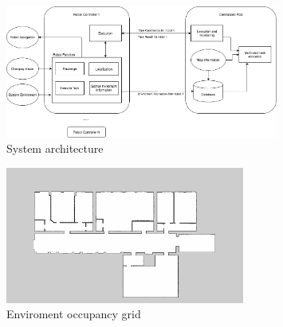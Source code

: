 \begin{figure}[htbp]
	\centering
	\includegraphics[width = 0.8\textwidth]{content/images/ch3/architecture.drawio.png}
	\caption{System architecture}
	\label{fig:system_architecture}
\end{figure}

\begin{figure}[htbp]
	\centering
	\includegraphics[width = 0.7\textwidth]{content/images/ch3/occupancy_grid.png}
	\caption{Enviroment occupancy grid}
	\label{fig:occupancy_grid}
\end{figure}

